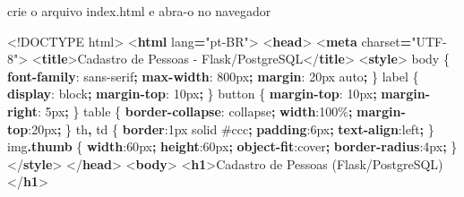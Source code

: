 \documentclass[
]{book}
\newenvironment{Shaded}{\begin{snugshade}}{\end{snugshade}}
\newcommand{\BuiltInTok}[1]{#1}
\newcommand{\CharTok}[1]{\textcolor[rgb]{0.31,0.60,0.02}{#1}}
\newcommand{\ConstantTok}[1]{\textcolor[rgb]{0.56,0.35,0.01}{#1}}
\newcommand{\DataTypeTok}[1]{\textcolor[rgb]{0.13,0.29,0.53}{#1}}
\newcommand{\DecValTok}[1]{\textcolor[rgb]{0.00,0.00,0.81}{#1}}
\newcommand{\FunctionTok}[1]{\textcolor[rgb]{0.13,0.29,0.53}{\textbf{#1}}}
\newcommand{\KeywordTok}[1]{\textcolor[rgb]{0.13,0.29,0.53}{\textbf{#1}}}
\newcommand{\NormalTok}[1]{#1}
\newcommand{\OperatorTok}[1]{\textcolor[rgb]{0.81,0.36,0.00}{\textbf{#1}}}
\newcommand{\OtherTok}[1]{\textcolor[rgb]{0.56,0.35,0.01}{#1}}
\newcommand{\StringTok}[1]{\textcolor[rgb]{0.31,0.60,0.02}{#1}}
\begin{document}
crie o arquivo index.html e abra-o no navegador

\begin{Shaded}
\begin{Highlighting}[]
\DataTypeTok{\textless{}!DOCTYPE}\NormalTok{ html}\DataTypeTok{\textgreater{}}
\DataTypeTok{\textless{}}\KeywordTok{html}\OtherTok{ lang}\OperatorTok{=}\StringTok{"pt{-}BR"}\DataTypeTok{\textgreater{}}
\DataTypeTok{\textless{}}\KeywordTok{head}\DataTypeTok{\textgreater{}}
\DataTypeTok{\textless{}}\KeywordTok{meta}\OtherTok{ charset}\OperatorTok{=}\StringTok{"UTF{-}8"}\DataTypeTok{\textgreater{}}
\DataTypeTok{\textless{}}\KeywordTok{title}\DataTypeTok{\textgreater{}}\NormalTok{Cadastro de Pessoas {-} Flask/PostgreSQL}\DataTypeTok{\textless{}/}\KeywordTok{title}\DataTypeTok{\textgreater{}}
\DataTypeTok{\textless{}}\KeywordTok{style}\DataTypeTok{\textgreater{}}
\NormalTok{  body \{ }\KeywordTok{font{-}family}\CharTok{:} \DecValTok{sans{-}serif}\OperatorTok{;} \KeywordTok{max{-}width}\CharTok{:} \DecValTok{800}\DataTypeTok{px}\OperatorTok{;} \KeywordTok{margin}\CharTok{:} \DecValTok{20}\DataTypeTok{px} \BuiltInTok{auto}\OperatorTok{;}\NormalTok{ \}}
\NormalTok{  label \{ }\KeywordTok{display}\CharTok{:} \DecValTok{block}\OperatorTok{;} \KeywordTok{margin{-}top}\CharTok{:} \DecValTok{10}\DataTypeTok{px}\OperatorTok{;}\NormalTok{ \}}
\NormalTok{  button \{ }\KeywordTok{margin{-}top}\CharTok{:} \DecValTok{10}\DataTypeTok{px}\OperatorTok{;} \KeywordTok{margin{-}right}\CharTok{:} \DecValTok{5}\DataTypeTok{px}\OperatorTok{;}\NormalTok{ \}}
\NormalTok{  table \{ }\KeywordTok{border{-}collapse}\CharTok{:} \DecValTok{collapse}\OperatorTok{;} \KeywordTok{width}\CharTok{:}\DecValTok{100}\DataTypeTok{\%}\OperatorTok{;} \KeywordTok{margin{-}top}\CharTok{:}\DecValTok{20}\DataTypeTok{px}\OperatorTok{;}\NormalTok{ \}}
\NormalTok{  th}\OperatorTok{,}\NormalTok{ td \{ }\KeywordTok{border}\CharTok{:}\DecValTok{1}\DataTypeTok{px} \DecValTok{solid} \ConstantTok{\#ccc}\OperatorTok{;} \KeywordTok{padding}\CharTok{:}\DecValTok{6}\DataTypeTok{px}\OperatorTok{;} \KeywordTok{text{-}align}\CharTok{:}\DecValTok{left}\OperatorTok{;}\NormalTok{ \}}
\NormalTok{  img}\FunctionTok{.thumb}\NormalTok{ \{ }\KeywordTok{width}\CharTok{:}\DecValTok{60}\DataTypeTok{px}\OperatorTok{;} \KeywordTok{height}\CharTok{:}\DecValTok{60}\DataTypeTok{px}\OperatorTok{;} \KeywordTok{object{-}fit}\CharTok{:}\DecValTok{cover}\OperatorTok{;} \KeywordTok{border{-}radius}\CharTok{:}\DecValTok{4}\DataTypeTok{px}\OperatorTok{;}\NormalTok{ \}}
\DataTypeTok{\textless{}/}\KeywordTok{style}\DataTypeTok{\textgreater{}}
\DataTypeTok{\textless{}/}\KeywordTok{head}\DataTypeTok{\textgreater{}}
\DataTypeTok{\textless{}}\KeywordTok{body}\DataTypeTok{\textgreater{}}
\DataTypeTok{\textless{}}\KeywordTok{h1}\DataTypeTok{\textgreater{}}\NormalTok{Cadastro de Pessoas (Flask/PostgreSQL)}\DataTypeTok{\textless{}/}\KeywordTok{h1}\DataTypeTok{\textgreater{}}


\end{Highlighting}
\end{Shaded}
\end{document}
